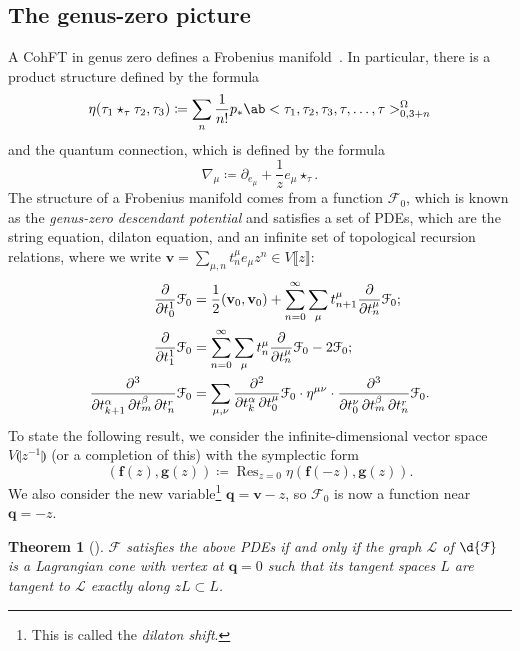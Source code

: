 \documentclass[10pt,oldfontcommands,oneside]{memoir}
\newtheorem{thm}{Theorem}[section]
\theoremstyle{definition}
\theoremstyle{remark}
\theoremstyle{plain}
\theoremstyle{definition}
\theoremstyle{remark}
\newcommand{\mc}[1]{\mathcal{#1}}
\newcommand{\mbf}[1]{\mathbf{#1}}
\newcommand{\bv}{\mbf{v}}
\newcommand{\bq}{\mbf{q}}
\newcommand{\on}[1]{\operatorname{#1}}
\newcommand{\1}{\mathbf{1}}
\newcommand{\2}{\mathbf{2}}
\newcommand{\3}{\mathbf{3}}
\newcommand{\ps}[1]{\llbracket #1 \rrbracket}
\newcommand{\ls}[1]{\llparenthesis #1 \rrparenthesis}
\begin{document}
\subsection{The genus-zero picture}%
\label{sub:The genus-zero picture}

A CohFT in genus zero defines a Frobenius manifold~\cite{geom2dtft}. In particular, there is a product structure defined by the formula
\[ \eta(\tau_1 \star_{\tau} \tau_2, \tau_3) \coloneqq \sum_n \frac{1}{n!} p_* \ab<\tau_1, \tau_2, \tau_3, \tau,\ldots, \tau>_{0,3+n}^{\Omega} \]
and the quantum connection, which is defined by the formula
\[ \nabla_{\mu} \coloneqq \partial_{e_{\mu}} + \frac{1}{z} e_{\mu} \star_{\tau}. \]
The structure of a Frobenius manifold comes from a function $\mc{F}_0$, which is known as the \textit{genus-zero descendant potential} and satisfies a set of PDEs, which are the string equation, dilaton equation, and an infinite set of topological recursion relations, where we write $\bv = \sum_{\mu,n} t^{\mu}_n e_{\mu} z^n \in V\ps{z}$:
\begin{align*}
    \pdv{}{t_0^1} \mc{F}_0 &= \frac{1}{2} (\bv_0, \bv_0) + \sum_{n=0}^{\infty} \sum_{\mu} t_{n+1}^{\mu} \pdv{}{t_n^{\mu}} \mc{F}_0; \\
    \pdv{}{t_1^1} \mc{F}_0 &= \sum_{n=0}^{\infty} \sum_{\mu} t_n^{\mu} \pdv{}{t_n^{\mu}}\mc{F}_0 - 2 \mc{F}_0; \\
    \pdv{}{t_{k+1}^{\alpha},t_m^{\beta},t_n^{r}} \mc{F}_0 &= \sum_{\mu,\nu} \pdv{}{t_k^{\alpha},t_0^{\mu}} \mc{F}_0 \cdot \eta^{\mu\nu} \cdot \pdv{}{t_0^{\nu},t_{m}^{\beta},t_n^{r}} \mc{F}_0.
\end{align*}
To state the following result, we consider the infinite-dimensional vector space $V\ls{z^{-1}}$ (or a completion of this) with the symplectic form
\[ (\mbf{f}(z), \mbf{g}(z)) \coloneqq \on{Res}_{z=0}\eta(\mbf{f}(-z), \mbf{g}(z)). \]
We also consider the new variable\footnote{This is called the \textit{dilaton shift}.} $\bq = \bv - z$, so $\mc{F}_0$ is now a function near $\bq = -z$.

\begin{thm}[{\cite{symplfrob}}]
    $\mc{F}$ satisfies the above PDEs if and only if the graph $\mc{L}$ of $\d{\mc{F}}$ is a Lagrangian cone with vertex at $\bq = 0$ such that its tangent spaces $L$ are tangent to $\mc{L}$ exactly along $zL \subset L$.
\end{thm}
\end{document}
